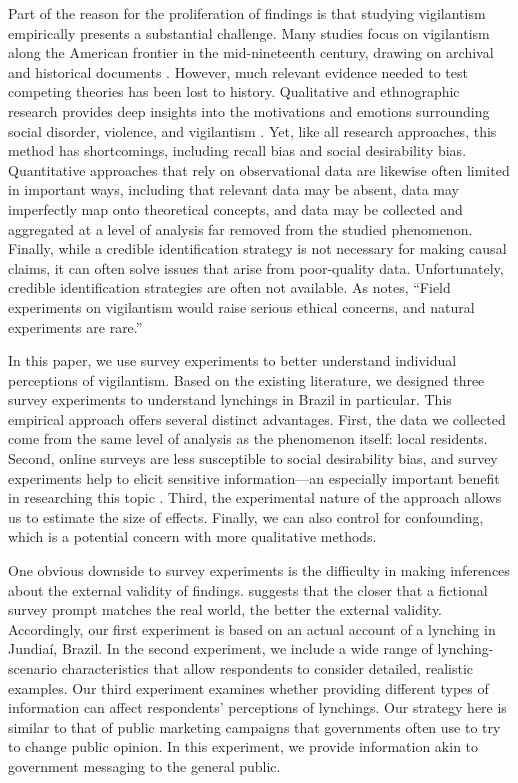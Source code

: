 \documentclass[12pt,ansiapaper]{article}
\begin{document}
Part of the reason for the proliferation of findings is that studying vigilantism empirically presents a substantial challenge. Many studies focus on vigilantism along the American frontier in the mid-nineteenth century, drawing on archival and historical documents  \citep{brown1975strain, courtwright2009violent, obert2018six}. However, much relevant evidence needed to test competing theories has been lost to history. Qualitative and ethnographic research provides deep insights into the motivations and emotions surrounding social disorder, violence, and vigilantism \citep{godoy2002lynchings}. Yet, like all research approaches, this method has shortcomings, including recall bias and social desirability bias. Quantitative approaches that rely on observational data are likewise often limited in important ways, including that relevant data may be absent, data may imperfectly map onto theoretical concepts, and data may be collected and aggregated at a level of analysis far removed from the studied phenomenon. Finally, while a credible identification strategy is not necessary for making causal claims, it can often solve issues that arise from poor-quality data. Unfortunately, credible identification strategies are often not available.  As \citet[17]{bateson2020politics} notes, ``Field experiments on vigilantism would raise serious ethical concerns, and natural experiments are rare.''

In this paper, we use survey experiments to better understand individual perceptions of vigilantism. Based on the existing literature, we designed three survey experiments to understand lynchings in Brazil in particular. This empirical approach offers several distinct advantages. First, the data we collected come from the same level of analysis as the phenomenon itself: local residents. Second, online surveys are less susceptible to social desirability bias, and survey experiments help to elicit sensitive information---an especially important benefit in researching this topic \citep{grimm2010social}. Third, the experimental nature of the approach allows us to estimate the size of effects. Finally, we can also control for confounding, which is a potential concern with more qualitative methods.

One obvious downside to survey experiments is the difficulty in making inferences about the external validity of findings. \citet[17-18]{bateson2020politics} suggests that the closer that a fictional survey prompt matches the real world, the better the external validity. Accordingly, our first experiment is based on an actual account of a lynching in Jundia\'{i}, Brazil. In the second experiment, we include a wide range of lynching-scenario characteristics that allow respondents to consider detailed, realistic examples. Our third experiment examines whether providing different types of information can affect respondents' perceptions of lynchings. Our strategy here is similar to that of public marketing campaigns that governments often use to try to change public opinion. In this experiment, we provide information akin to government messaging to the general public.
\end{document}
